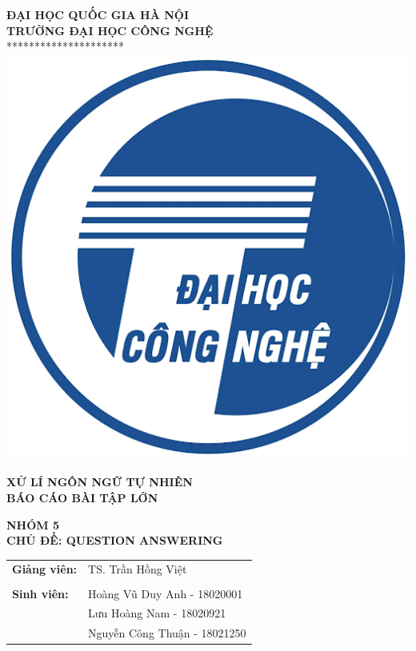 \documentclass[11pt]{article}
\begin{document}
\begin{titlepage}
\begin{center}
    \textbf{\Large ĐẠI HỌC QUỐC GIA HÀ NỘI}\\
    \textbf{\Large TRƯỜNG ĐẠI HỌC CÔNG NGHỆ}\\
    
    *********************\\
    \vskip 0.5in
    \includegraphics[width=0.35\linewidth]{UET_logo.png}

    \vskip 0.5in
    \textbf{\huge XỬ LÍ NGÔN NGỮ TỰ NHIÊN}\\
    
    \textbf{\huge BÁO CÁO BÀI TẬP LỚN}\\
    
    \vskip 0.3in
    
    \textbf{\Large NHÓM 5}\\
    \textbf{\Large CHỦ ĐỀ: QUESTION ANSWERING}\\
\end{center}
\vskip 0.5in
\begin{table}[h!]
\centering
\begin{tabular}{ll}
\textbf{Giảng viên:} & TS. Trần Hồng Việt \\
                     &                        \\
\textbf{Sinh viên:}  & Hoàng Vũ Duy Anh - 18020001 \\
                     & Lưu Hoàng Nam - 18020921 \\
                     & Nguyễn Công Thuận - 18021250 \\
\end{tabular}
\end{table}

\newpage

\end{titlepage}

\tableofcontents
\newpage

\listoffigures
\newpage


\newpage

\newpage
\end{document}
